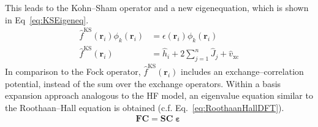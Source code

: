 This leads to the Kohn--Sham operator and a new eigenequation, which is shown in Eq~\eqref{eq:KSEigeneq}.
\begin{align}
	\hat{f}^\mathrm{KS}(\textbf{r}_i) \phi_k(\textbf{r}_i) &= \epsilon(\textbf{r}_i) \phi_k(\textbf{r}_i)\label{eq:KSEigeneq}\\
	\hat{f}^\mathrm{KS}(\textbf{r}_i) &= \hat{h}_i + 2 \sum^n_{j=1} \hat{J}_j + \hat{v}_\mathrm{xc} 
\end{align}
In comparison to the Fock operator, $\hat{f}^\mathrm{KS}(\textbf{r}_i)$ includes an exchange--correlation potential, instead of the sum over the exchange operators.
Within a basis expansion approach analogous to the HF model,
an eigenvalue equation similar to the Roothaan--Hall equation is obtained (c.f. Eq.~\eqref{eq:RoothaanHallDFT}).
	\begin{align}
		\label{eq:RoothaanHallDFT}
		\textbf{F} \textbf{C} = \textbf{S} \textbf{C} \bm{\upepsilon}
	\end{align}


